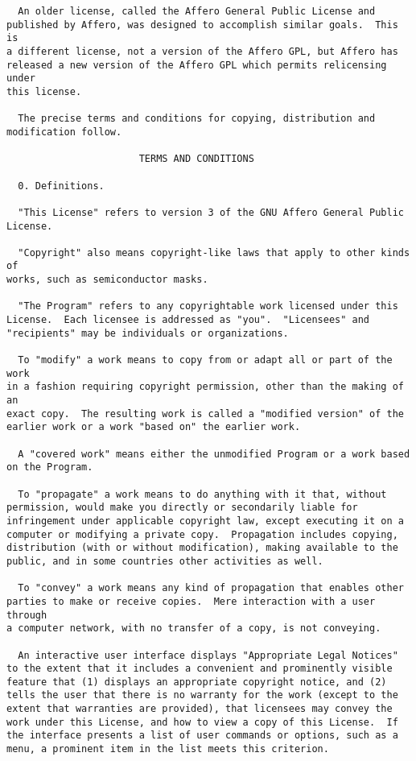 \documentclass[11pt]{article}
\begin{document}
\begin{verbatim}
  An older license, called the Affero General Public License and
published by Affero, was designed to accomplish similar goals.  This is
a different license, not a version of the Affero GPL, but Affero has
released a new version of the Affero GPL which permits relicensing under
this license.

  The precise terms and conditions for copying, distribution and
modification follow.

                       TERMS AND CONDITIONS

  0. Definitions.

  "This License" refers to version 3 of the GNU Affero General Public License.

  "Copyright" also means copyright-like laws that apply to other kinds of
works, such as semiconductor masks.

  "The Program" refers to any copyrightable work licensed under this
License.  Each licensee is addressed as "you".  "Licensees" and
"recipients" may be individuals or organizations.

  To "modify" a work means to copy from or adapt all or part of the work
in a fashion requiring copyright permission, other than the making of an
exact copy.  The resulting work is called a "modified version" of the
earlier work or a work "based on" the earlier work.

  A "covered work" means either the unmodified Program or a work based
on the Program.

  To "propagate" a work means to do anything with it that, without
permission, would make you directly or secondarily liable for
infringement under applicable copyright law, except executing it on a
computer or modifying a private copy.  Propagation includes copying,
distribution (with or without modification), making available to the
public, and in some countries other activities as well.

  To "convey" a work means any kind of propagation that enables other
parties to make or receive copies.  Mere interaction with a user through
a computer network, with no transfer of a copy, is not conveying.

  An interactive user interface displays "Appropriate Legal Notices"
to the extent that it includes a convenient and prominently visible
feature that (1) displays an appropriate copyright notice, and (2)
tells the user that there is no warranty for the work (except to the
extent that warranties are provided), that licensees may convey the
work under this License, and how to view a copy of this License.  If
the interface presents a list of user commands or options, such as a
menu, a prominent item in the list meets this criterion.


\end{verbatim}
\end{document}
